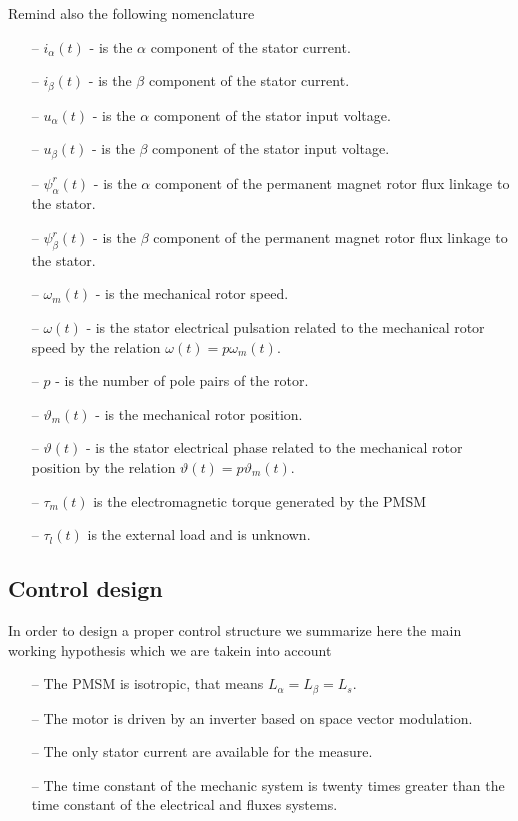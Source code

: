 \documentclass[11pt,a4paper,oneside]{book}
\numberwithin{equation}{section}
\theoremstyle{it}
\theoremstyle{definition}
\begin{document}
Remind also the following nomenclature
\begin{itemize}
	\item[--] $i_\alpha(t)$ - is the $\alpha$ component of the stator current.
	\item[--] $i_\beta(t)$ - is the $\beta$ component of the stator current.
	\item[--] $u_\alpha(t)$ - is the $\alpha$ component of the stator input voltage.
	\item[--] $u_\beta(t)$ - is the $\beta$ component of the stator input voltage.
	\item[--] $\psi_\alpha^r(t)$ - is the $\alpha$ component of the permanent magnet rotor flux linkage to the stator.
	\item[--] $\psi_\beta^r(t)$ - is the $\beta$ component of the permanent magnet rotor flux linkage to the stator.
	\item[--] $\omega_m(t)$ - is the mechanical rotor speed.
	\item[--] $\omega(t)$ - is the stator electrical pulsation related to the mechanical rotor speed by the relation $\omega(t)=p\omega_m(t)$.
	\item[--] $p$ - is the number of pole pairs of the rotor.
	\item[--] $\vartheta_m(t)$ - is the mechanical rotor position.
	\item[--] $\vartheta(t)$ - is the stator electrical phase related to the mechanical rotor position by the relation $\vartheta(t)=p\vartheta_m(t)$.
	\item[--] $\tau_m(t)$ is the electromagnetic torque generated by the PMSM
	\item[--] $\tau_l(t)$ is the external load and is unknown.
\end{itemize}

\subsection{Control design}
In order to design a proper control structure we summarize here the main working hypothesis which we are takein into account
\begin{itemize}
	\item[--] The PMSM is isotropic, that means $L_\alpha=L_\beta=L_s$.
	\item[--] The motor is driven by an inverter based on space vector 
	modulation.
	\item[--] The only stator current are available for the measure.
	\item[--] The time constant of the mechanic system is twenty times greater 
	than the time constant of the electrical and fluxes systems.
\end{itemize}
\end{document}
